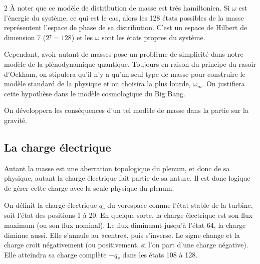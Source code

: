 \begin{multicols}{2}
À noter que ce modèle de distribution de masse est très hamiltonien.
Si $\omega$ est l'énergie du système, ce qui est le cas, alors les 128 états
possibles de la masse représentent l'espace de phase de sa distribution.
C'est un espace de Hilbert de dimension 7 ($2⁷=128$) et les $\omega$ sont les
états propres du système.

Cependant, avoir autant de masses pose un problème de simplicité
dans notre modèle de la plénodynamique quantique. Toujours en raison
du principe du rasoir d'Ockham, on stipulera qu'il n'y a qu'un seul type de masse
pour construire le modèle standard de la physique et on choisira la
plus lourde, $\omega_m$. On justifiera cette hypothèse dans le modèle
cosmologique du Big Bang.

On développera les conséquences d'un tel modèle de masse dans la
partie sur la gravité.

\subsection{La charge électrique}

Autant la masse est une aberration topologique du plenum, et donc de sa
physique, autant la charge électrique fait partie de sa nature. Il
est donc logique de gérer cette charge avec la seule physique du
plenum.

On définit la charge électrique $q_v$ du vorespace comme l'état stable de la
turbine, soit l'état des positions 1 à 20. En quelque sorte, la charge
électrique est son flux maximum (ou son flux nominal). Le flux
diminuant jusqu'à l'état 64, la charge diminue aussi. Elle s'annule au
«centre», puis s'inverse. Le signe change et la charge croit
négativement (ou positivement, si l'on part d'une charge négative).
Elle atteindra sa charge complète $-q_v$ dans les états 108 à 128.


\end{multicols}
